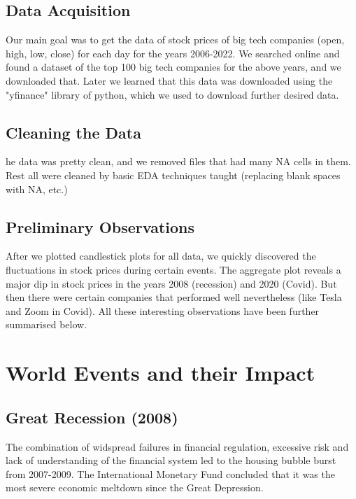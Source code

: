 \documentclass[11pt, twocolumn]{article}
\begin{document}
\begin{justify}
\vspace{-5pt}

\subsection{Data Acquisition}
Our main goal was to get the data of stock prices of big tech companies (open, high, low, close) for each day for the years 2006-2022. We searched online and found a dataset of the top 100 big tech companies for the above years, and we downloaded that. Later we learned that this data was downloaded using the "yfinance" library of python, which we used to download further desired data.\vspace{-5pt}
\subsection{Cleaning the Data} 
he data was pretty clean, and we removed files that had many NA cells in them. Rest all were cleaned by basic EDA techniques taught (replacing blank spaces with NA, etc.)
\vspace{-5pt}
\subsection{Preliminary Observations}
After we plotted candlestick plots for all data, we quickly discovered the fluctuations in stock prices during certain events. The aggregate plot reveals a major dip in stock prices in the years 2008 (recession) and 2020 (Covid). But then there were certain companies that performed well nevertheless (like Tesla and Zoom in Covid). All these interesting observations have been further summarised below.


\section{\huge World Events and their Impact}
\vspace{-5pt}

\subsection{Great Recession (2008)}
The combination of widspread failures in financial regulation, excessive risk and lack of understanding of the financial system led to the housing bubble burst from 2007-2009.
The International Monetary Fund concluded that it was the most severe economic meltdown since the Great Depression.
\vspace{1em}



\end{justify}
\end{document}

